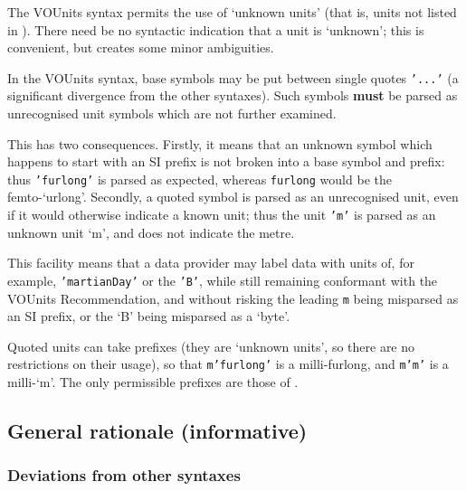 \documentclass[11pt,a4paper]{ivoa}
\newcommand{\unit}[1]{\texttt{\small\color{orange}#1}}
\newcommand*\norm[1]{\textbf{\color{ivoacolor}#1}}
\begin{document}
The VOUnits syntax permits the use of `unknown units' (that is, units not listed
in ).  There need be no syntactic indication that
a unit is `unknown'; this is convenient, but creates some minor
ambiguities.

In the VOUnits syntax, base symbols may be put between single
quotes \unit{'...'} (a significant divergence from the other
syntaxes).  Such symbols \norm{must} be parsed as
unrecognised unit symbols which are not further examined.

This has two consequences.  Firstly, it means that an unknown symbol
which happens to start with an SI prefix is not broken
into a base symbol and prefix: thus \unit{'furlong'} is parsed as
expected, whereas \unit{furlong} would be the femto-`urlong'.
Secondly, a quoted symbol is parsed as an unrecognised unit, even if
it would otherwise indicate a known unit; thus the unit \unit{'m'} is
parsed as an unknown unit `m', and does not indicate the metre.

This facility means that a data provider may label data with units of,
for example, \unit{'martianDay'} or the \unit{'B'}, while still
remaining conformant with the VOUnits Recommendation, and without
risking the leading \texttt{m} being misparsed as an SI prefix, or the
`B' being misparsed as a `byte'.

Quoted units can take prefixes (they are `unknown units', so there are
no restrictions on their usage), so that \unit{m'furlong'} is a
milli-furlong, and \unit{m'm'} is a milli-`m'.  The only permissible
prefixes are those of .

\subsection{General rationale (informative)}
\label{sec:rationale}

\subsubsection{Deviations from other syntaxes}
\label{sec:deviations}
\end{document}
